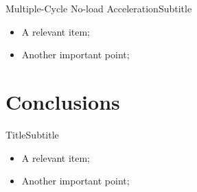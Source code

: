 
    \begin{frame}{Multiple-Cycle No-load Acceleration}{Subtitle}\vspace*{-2em}
        \begin{itemize}
            \item<2->  A \alert{relevant} item;
            \item<3->  Another \alert{important} point;
        \end{itemize}
    \end{frame}

\section{Conclusions}

    \begin{frame}{Title}{Subtitle}\vspace*{-2em}
        \begin{itemize}
            \item<2->  A \alert{relevant} item;
            \item<3->  Another \alert{important} point;
        \end{itemize}
    \end{frame}






